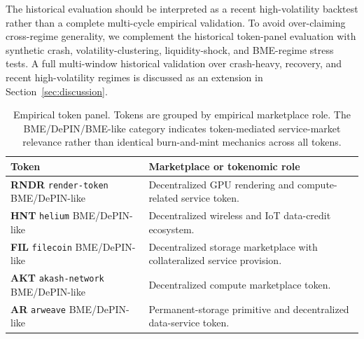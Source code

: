 \documentclass[a4paper,fleqn]{cas-dc}
\begin{document}
The historical evaluation should be interpreted as a recent high-volatility backtest rather than a complete multi-cycle empirical validation. To avoid over-claiming cross-regime generality, we complement the historical token-panel evaluation with synthetic crash, volatility-clustering, liquidity-shock, and BME-regime stress tests. A full multi-window historical validation over crash-heavy, recovery, and recent high-volatility regimes is discussed as an extension in Section~\ref{sec:discussion}.

\begin{table}[!t]
\centering
\caption{Empirical token panel. Tokens are grouped by empirical marketplace role. The BME/DePIN/BME-like category indicates token-mediated service-market relevance rather than identical burn-and-mint mechanics across all tokens.}
\label{tab:token_panel}
\footnotesize
\setlength{\tabcolsep}{4pt}
\renewcommand{\arraystretch}{1.18}
\begin{tabular}{|p{}|p{}|}
\hline
\textbf{Token} & \textbf{Marketplace or tokenomic role} \\
\hline

\textbf{RNDR}\newline
\texttt{render-token}\newline
BME/DePIN-like &
Decentralized GPU rendering and compute-related service token. \\
\hline

\textbf{HNT}\newline
\texttt{helium}\newline
BME/DePIN-like &
Decentralized wireless and IoT data-credit ecosystem. \\
\hline

\textbf{FIL}\newline
\texttt{filecoin}\newline
BME/DePIN-like &
Decentralized storage marketplace with collateralized service provision. \\
\hline

\textbf{AKT}\newline
\texttt{akash-network}\newline
BME/DePIN-like &
Decentralized compute marketplace token. \\
\hline

\textbf{AR}\newline
\texttt{arweave}\newline
BME/DePIN-like &
Permanent-storage primitive and decentralized data-service token. \\
\hline


\end{tabular}
\end{table}
\end{document}
